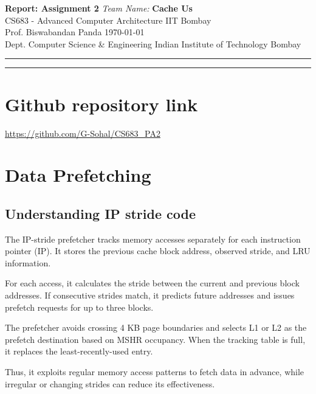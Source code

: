 \documentclass[a4paper, 11pt]{article}
\begin{document}
\noindent
\large\textbf{Report: Assignment 2} \hfill \textit{Team Name: }\textbf{Cache Us} \\
\normalsize CS683 - Advanced Computer Architecture \hfill IIT Bombay \\
Prof. Biswabandan Panda \hfill \today \\
Dept. Computer Science \& Engineering \hfill Indian Institute of Technology Bombay
 
\vspace{0.5em}
\hrule
\vspace{0.8em}
 
\tableofcontents
\vspace{1em}
\hrule
\vspace{1.5em}

\section{Github repository link}
\hyperlink{CS683_PA2}{https://github.com/G-Sohal/CS683\_PA2}
 
\section{Data Prefetching}
\subsection{Understanding IP stride code}
The IP-stride prefetcher tracks memory accesses separately for each instruction pointer (IP). It stores the previous cache block address, observed stride, and LRU information.

For each access, it calculates the stride between the current and previous block addresses. If consecutive strides match, it predicts future addresses and issues prefetch requests for up to three blocks.

The prefetcher avoids crossing 4 KB page boundaries and selects L1 or L2 as the prefetch destination based on MSHR occupancy. When the tracking table is full, it replaces the least-recently-used entry.

Thus, it exploits regular memory access patterns to fetch data in advance, while irregular or changing strides can reduce its effectiveness.
\end{document}

